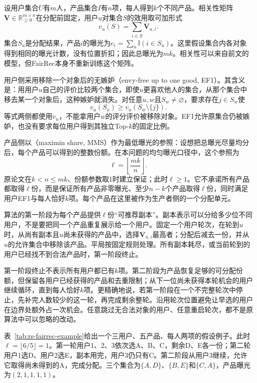 设用户集合$U$有$m$人，产品集合$I$有$n$项，每人得到$k$个不同产品。相关性矩阵$\bm{V}\in\mathbb{R}_{\geq0}^{m\times n}$在分配前固定，用户$u$对集合$S$的效用取可加形式
\[
 v_u(S)=\sum_{i\in S}\bm{V}_{u,i}.
\]
集合$S_u$是分配结果，产品$i$的曝光为$e_i=\sum_u\mathbb{I}(i\in S_u)$。这里假设集合内各对象得到相同的曝光计数，没有位置折扣；因此总曝光为$mk$。相关性可以来自前文的模型，但FairRec本身不重新训练这个矩阵。

用户侧采用移除一个对象后的无嫉妒（envy-free up to one good, EF1）。其含义是：用用户$u$自己的评价比较两个集合，即使$u$更喜欢他人的集合，从那个集合中移去某一个对象后，这种嫉妒就消失。对任意$u,w$且$S_w\ne\varnothing$，要求存在$j\in S_w$使
\begin{equation}
 v_u(S_u)\geq v_u(S_w\setminus\{j\}).
 \label{eq:rs-fairrec-ef1}
\end{equation}
等式两侧都使用$v_u$，不能拿用户$w$的评分评价被移除对象。EF1允许原集合仍被嫉妒，也没有要求每位用户得到其独立Top-$k$的固定比例。

产品侧以（maximin share, MMS）作为最低曝光的参照：设想把总曝光尽量均分后，每个产品可以得到的整数份额。在本问题的均匀曝光口径中，这个参照为
\[
 \ell=\left\lfloor\frac{mk}{n}\right\rfloor.
\]
原论文在$k<n\leq mk$、份额参数取1时建立保证；此时$\ell\geq1$。它不承诺所有产品都取得$\ell$份，而是保证所有产品非零曝光、至少$n-k$个产品取得$\ell$份，同时满足用户EF1与每人恰好$k$项。每个产品在这里被作为生产者侧的一个分配单元。

算法的第一阶段为每个产品提供$\ell$份“可推荐副本”。副本表示可以分给多少位不同用户，不是要把同一个产品重复展示给一个用户。固定一个用户轮次，在轮到$u$时，从尚有副本且$u$尚未获得的产品中，选择$\bm{V}_{u,i}$最高者；分配后减去一份，并从$u$的允许集合中移除该产品。平局按固定规则处理。所有副本耗尽，或当前轮到的用户已经找不到合法产品时，第一阶段终止。

第一阶段终止不表示所有用户都已有$k$项。第二阶段为产品恢复足够的可分配份额，但保留各用户已经获得的产品和去重限制；从下一位尚未获得本轮机会的用户继续循环，直到每人恰好$k$项。更精确地说，若第一阶段在一个不完整轮次中停止，先补完人数较少的这一轮，再完成剩余整轮。沿用轮次位置避免让早选的用户在边界处额外占一次机会。任意跳过无合法对象的用户、任意重启轮次，都不是原算法中可以忽略的改动。

表~\ref{tab:rs-fairrec-example}给出一个三用户、五产品、每人两项的假设例子。此时$\ell=\lfloor6/5\rfloor=1$。第一轮用户1、2、3依次选A、B、C，剩余D、E各一份；第二轮用户1选D、用户2选E，副本用完，用户3仍只有C。第二阶段从用户3继续，允许它取得尚未得到的A，完成分配。三个集合为$\{A,D\}$、$\{B,E\}$和$\{C,A\}$，产品曝光为$(2,1,1,1,1)$。

